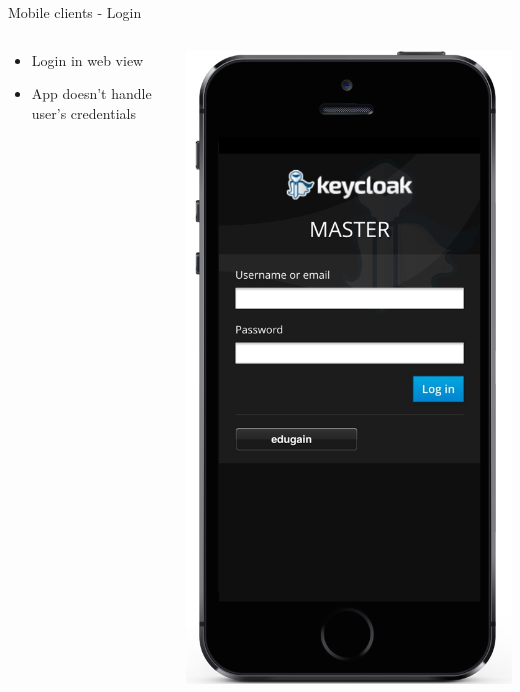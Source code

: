 \documentclass[11pt]{beamer}
\newcommand{\todo}[1]{\raisebox{0pt}{\parbox{0pt}{\begin{large}\colorbox{red}{todo: #1}\end{large} \hspace*{0.05cm}}}}
\begin{document}
\begin{frame}{Mobile clients - Login}

  \begin{columns}[T]
	\begin{column}{.6\textwidth}
	\begin{itemize}
		\item Login in web view
		\item App doesn't handle user's credentials
	\end{itemize}
	\end{column}
	\begin{column}{.4\textwidth}
	   \includegraphics[scale=0.27]{loginview}
	\end{column}
\end{columns}

\end{frame}
\end{document}

